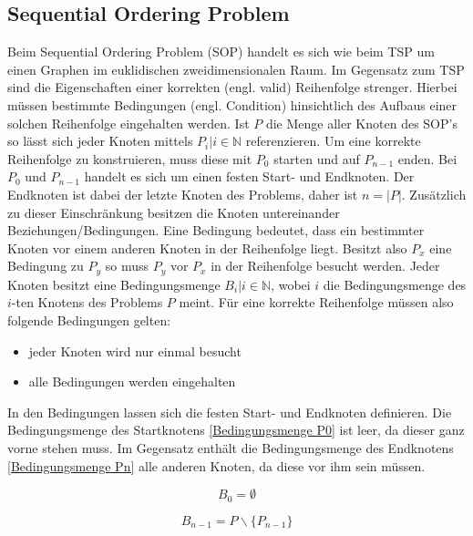 \documentclass[conference]{IEEEtran}
\begin{document}
    \subsection{Sequential Ordering Problem}
      Beim Sequential Ordering Problem (SOP) handelt es sich wie beim TSP um einen Graphen im euklidischen zweidimensionalen Raum. 
      Im Gegensatz zum TSP sind die Eigenschaften einer korrekten (engl. valid) Reihenfolge strenger. Hierbei müssen 
      bestimmte Bedingungen (engl. Condition) hinsichtlich des Aufbaus einer solchen Reihenfolge eingehalten werden. 
      Ist $P$ die Menge aller Knoten des SOP's so lässt sich jeder Knoten mittels $P_i | i \in \mathbb{N}$ referenzieren. 
      Um eine korrekte Reihenfolge zu konstruieren, muss diese mit $P_0$ starten und auf $P_{n-1}$ enden. 
      Bei $P_0$ und $P_{n-1}$ handelt es sich um einen festen Start- und Endknoten. Der Endknoten ist dabei der letzte Knoten 
      des Problems, daher ist $n = |P|$.  Zusätzlich zu dieser Einschränkung besitzen die Knoten untereinander Beziehungen/Bedingungen. 
      Eine Bedingung bedeutet, dass ein bestimmter Knoten vor einem anderen Knoten in der Reihenfolge liegt. Besitzt also $P_x$ eine 
      Bedingung zu $P_y$ so muss $P_y$ vor $P_x$ in der Reihenfolge besucht werden. Jeder Knoten besitzt eine Bedingungsmenge $B_i | i \in \mathbb{N}$, 
      wobei $i$ die Bedingungsmenge des $i$-ten Knotens des Problems $P$ meint. Für eine korrekte Reihenfolge müssen also folgende Bedingungen gelten:
      \begin{itemize}
        \item jeder Knoten wird nur einmal besucht
        \item alle Bedingungen werden eingehalten
      \end{itemize}
    
      In den Bedingungen lassen sich die festen Start- und Endknoten definieren. 
      Die Bedingungsmenge des Startknotens \eqref{Bedingungsmenge P0} ist leer, 
      da dieser ganz vorne stehen muss. Im Gegensatz enthält die Bedingungsmenge des 
      Endknotens \eqref{Bedingungsmenge Pn} alle anderen Knoten, da diese vor ihm sein müssen. 
    
      
      \begin{equation}\label{Bedingungsmenge P0}
          B_0 = \emptyset
      \end{equation}
    
      
      \begin{equation}\label{Bedingungsmenge Pn}
          B_{n-1} = P\backslash\{P_{n-1}\}
      \end{equation}
    
\end{document}

